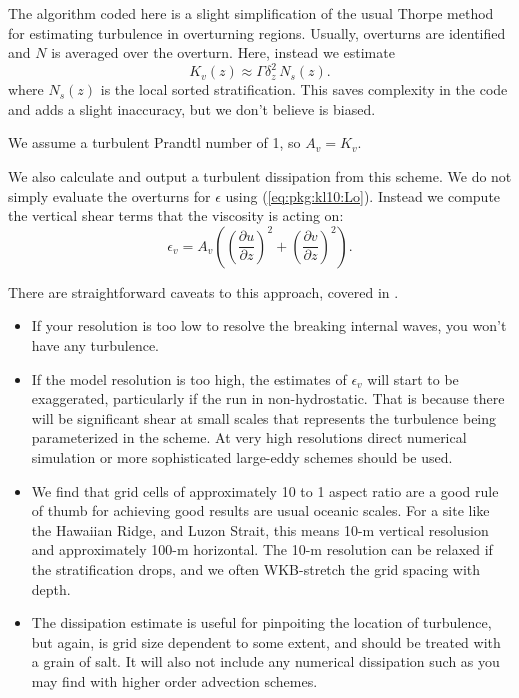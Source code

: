 The algorithm coded here is a slight simplification of the usual Thorpe method for estimating turbulence in overturning regions.  Usually, overturns are identified and $N$ is averaged over the overturn.  Here, instead we estimate
\begin{equation}
    K_{v}(z) \approx \Gamma \delta_z^2\, N_s(z).
\end{equation}
where $N_s(z)$ is the local sorted stratification.  This saves complexity in the code and adds a slight inaccuracy, but we don't believe is biased.

We assume a turbulent Prandtl number of 1, so $A_v=K_{v}$.

We also calculate and output a turbulent dissipation from this scheme.  We do not simply evaluate the overturns for $\epsilon$ using (\ref{eq:pkg:kl10:Lo}).  Instead we compute the vertical shear terms that the viscosity is acting on:
\begin{equation}
  \epsilon_v = A_v \left(\left(\frac{\partial u}{\partial z}\right)^2 + \left(\frac{\partial v}{\partial z}\right)^2 \right).
\end{equation}

There are straightforward caveats to this approach, covered in \citet{klymaklegg10}.
\begin{itemize}
    \item If your resolution is too low to resolve the breaking internal waves, you won't have any turbulence.
    \item If the model resolution is too high, the estimates of $\epsilon_v$ will start to be exaggerated, particularly if the run in non-hydrostatic.  That is because there will be significant shear at small scales that represents the turbulence being parameterized in the scheme.  At very high resolutions direct numerical simulation or more sophisticated large-eddy schemes should be used.
    \item We find that grid cells of approximately 10 to 1 aspect ratio are a good rule of thumb for achieving good results are usual oceanic scales.  For a site like the Hawaiian Ridge, and Luzon Strait, this means 10-m vertical resolusion and approximately 100-m horizontal.  The 10-m resolution can be relaxed if the stratification drops, and we often WKB-stretch the grid spacing with depth.
    \item The dissipation estimate is useful for pinpoiting the location of turbulence, but again, is grid size dependent to some extent, and should be treated with a grain of salt.  It will also not include any numerical dissipation such as you may find with higher order advection schemes.
\end{itemize}

